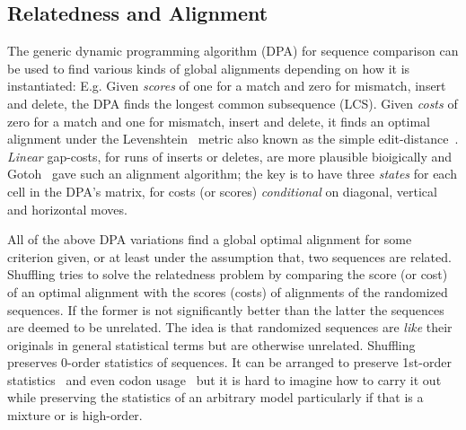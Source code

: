 \documentclass[letterpaper,11pt,oneside]{article}
\begin{document}
\subsection{Relatedness and Alignment} \label{sec:rel}

The generic dynamic programming algorithm (DPA) for
sequence comparison can be used to find various kinds
of global alignments depending on how it is instantiated: E.g.
Given {\em scores} of one for a match and zero for mismatch, insert and delete,
the DPA finds the longest common subsequence (LCS).
Given {\em costs} of zero for a match and one for mismatch, insert and delete,
it finds an optimal alignment under the Levenshtein~\cite{levenshtein66}
metric also known as the simple
edit-distance~\cite{sellers74}.
{\em Linear} gap-costs, for runs of inserts or deletes,
are more plausible bioigically and Gotoh~\cite{gotoh82}
gave such an alignment algorithm; the key is to have three {\em states}
for each cell in the DPA's matrix, for costs (or scores)
{\em conditional} on diagonal, vertical and horizontal moves.

All of the above DPA variations find a global optimal alignment for
some criterion given, or at least under the assumption that,
two sequences are related.
Shuffling tries to solve the relatedness problem by comparing the
score (or cost) of an optimal alignment with the scores (costs)
of alignments of the randomized sequences.
If the former is not significantly better than the latter
the sequences are deemed to be unrelated.
The idea is that randomized sequences are {\em like} their originals in
general statistical terms but are otherwise unrelated.
Shuffling preserves 0-order statistics of sequences.
It can be arranged to preserve 1st-order statistics~\cite{fitch83}
and even codon usage~\cite{altschul85} but it is hard to imagine how
to carry it out while preserving the statistics of an arbitrary model
particularly if that is a mixture or is high-order.
\end{document}
